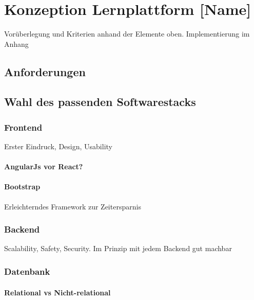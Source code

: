 \chapter{Konzeption Lernplattform [Name]}
\label{cha:Konzeption Lernplattform [Name]}
Vorüberlegung und Kriterien anhand der Elemente oben.
Implementierung im Anhang

\section{Anforderungen}

\section{Wahl des passenden Softwarestacks}
\subsection{Frontend}
Erster Eindruck, Design, Usability
\subsubsection{AngularJs vor React?}
\subsubsection{Bootstrap}
Erleichterndes Framework zur Zeitersparnis

\subsection{Backend}
Scalability, Safety, Security. Im Prinzip mit jedem Backend gut machbar

\subsection{Datenbank}
\subsubsection{Relational vs Nicht-relational}





